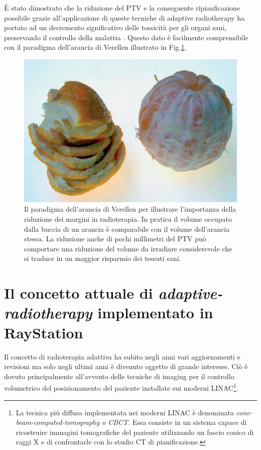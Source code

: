 \`E stato dimostrato che la riduzione del PTV e la conseguente ripianficazione possibile grazie all'applicazione di queste tecniche di adaptive radiotherapy ha portato ad un decremento significativo delle tossicità per gli organi sani, preservando il controllo della malattia \cite{Park2012}. Questo dato è facilmente comprensibile con il paradigma dell'arancia di Verellen \cite{Verellen2007} illustrato in Fig.\ref{fig:verellen}.
\begin{figure}[!t]
\centering
\includegraphics[width=.6\textwidth]{./cap3/Verellen.png}
\caption{Il paradigma dell'arancia di Verellen \cite{Verellen2007} per illustrare l'importanza della riduzione dei margini in radioterapia. In pratica il volume occupato dalla buccia di un arancia è comparabile con il volume dell'arancia stessa. La riduzione anche di pochi millimetri del PTV può comportare una riduzione del volume da irradiare considerevole che si traduce in un maggior risparmio dei tessuti sani.}
\label{fig:verellen}
\end{figure}



\section{Il concetto attuale di \textit{adaptive-radiotherapy} implementato in RayStation}
Il concetto di radioterapia adattiva ha subito negli anni vari aggiornamenti e revisioni ma solo negli ultimi anni è divenuto oggetto di grande interesse. Ciò è dovuto principalmente all'avvento  delle tecniche di imaging per il controllo volumetrico del posizionamento del paziente installate sui moderni LINAC\footnote{La tecnica più diffusa implementata nei moderni LINAC è denominata \textit{cone-beam-computed-tomography o CBCT}. Essa consiste in un sistema capace di ricostruire immagini tomografiche del paziente utilizzando un fascio conico di raggi X e di confrontarle con lo studio CT di pianificazione.}.

